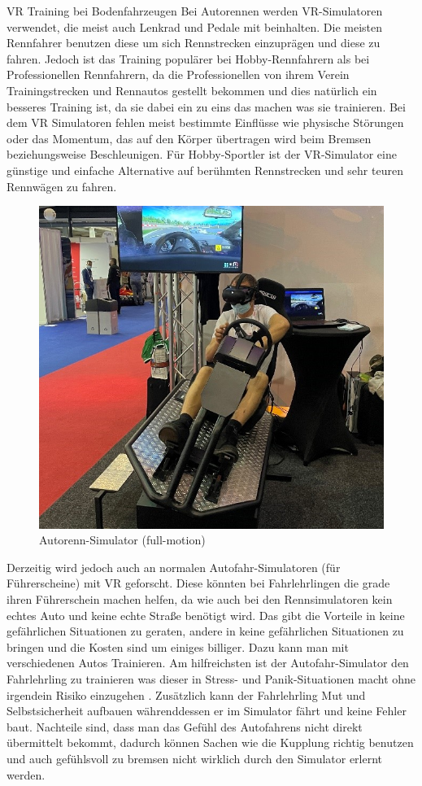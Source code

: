 VR Training bei Bodenfahrzeugen
Bei Autorennen werden VR-Simulatoren verwendet, die meist auch Lenkrad und Pedale mit beinhalten. Die meisten Rennfahrer benutzen diese um sich Rennstrecken einzuprägen und diese zu fahren. Jedoch ist das Training populärer bei Hobby-Rennfahrern als bei Professionellen Rennfahrern, da die Professionellen von ihrem Verein Trainingstrecken und Rennautos gestellt bekommen und dies natürlich ein besseres Training ist, da sie dabei ein zu eins das machen was sie trainieren. Bei dem VR Simulatoren fehlen meist bestimmte Einflüsse wie physische Störungen oder das Momentum, das auf den Körper übertragen wird beim Bremsen beziehungsweise Beschleunigen. Für Hobby-Sportler ist der VR-Simulator eine günstige und einfache Alternative auf berühmten Rennstrecken und sehr teuren Rennwägen zu fahren. 
\begin{figure}[!ht]
    \centering
    \includegraphics[width=1.0\textwidth]{images/Abbildung 2.jpg}
    \caption{\label{fig:Abbildung 2}Autorenn-Simulator (full-motion)\protect
    }
\end{figure}
Derzeitig wird jedoch auch an normalen Autofahr-Simulatoren (für Führerscheine) mit VR geforscht. Diese könnten bei Fahrlehrlingen die grade ihren Führerschein machen helfen, da wie auch bei den Rennsimulatoren kein echtes Auto und keine echte Straße benötigt wird. Das gibt die Vorteile in keine gefährlichen Situationen zu geraten, andere in keine gefährlichen Situationen zu bringen und die Kosten sind um einiges billiger. Dazu kann man mit verschiedenen Autos Trainieren. Am hilfreichsten ist der Autofahr-Simulator den Fahrlehrling zu trainieren was dieser in Stress- und Panik-Situationen macht ohne irgendein Risiko einzugehen \cite{ihemedu2017virtual}. Zusätzlich kann der Fahrlehrling Mut und Selbstsicherheit aufbauen währenddessen er im Simulator fährt und keine Fehler baut. Nachteile sind, dass man das Gefühl des Autofahrens nicht direkt übermittelt bekommt, dadurch können Sachen wie die Kupplung richtig benutzen und auch gefühlsvoll zu bremsen nicht wirklich durch den Simulator erlernt werden.
